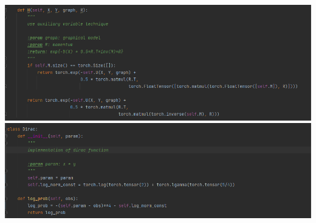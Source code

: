 \documentclass[10pt]{homeworg}
\begin{document}
\begin{center}
\includegraphics[scale=0.5]{code_snippets/H.png}
\includegraphics[scale=0.5]{code_snippets/dirac.png}
\end{center}
\end{document}
